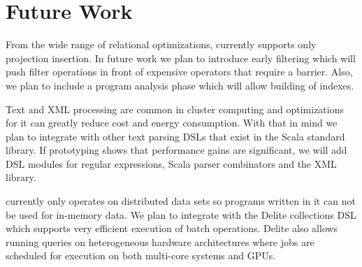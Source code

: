 \section{Future Work}
\label{sec:future-work}

From the wide range of relational optimizations, \tool currently supports only
 projection insertion. In future work we plan to introduce early filtering
 which will push filter operations in front of expensive operators that
 require a barrier. Also, we plan to include a program analysis phase which will
 allow building of indexes.

Text and XML processing are common in cluster computing and optimizations for it
can greatly reduce cost and energy consumption. With that in mind we plan to
integrate \tool with other text parsing DSLs that exist in the Scala standard
library. If prototyping shows that performance gains are significant, we will
add DSL modules for regular expressions, Scala parser combinators and the XML
library.

\tool currently only operates on distributed data sets so programs written in it
can not be used for in-memory data. We plan to integrate \tool with the Delite
\cite{brown_heterogeneous_2011} collections DSL which supports very efficient
execution of batch operations. Delite also allows running queries on
heterogeneous hardware architectures where jobs are scheduled for execution on
both multi-core systems and GPUs.
\\
